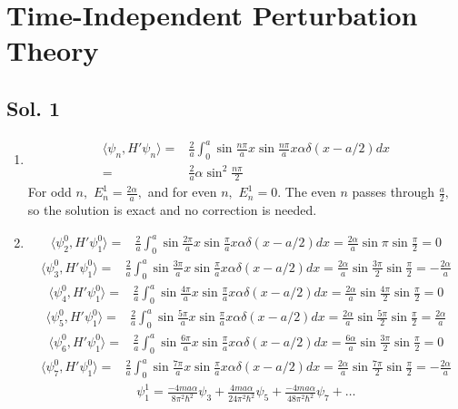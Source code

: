 \section{Time-Independent Perturbation Theory}
\subsection*{Sol. 1}
\begin{enumerate}
    \item 
    \begin{align*}
        \langle \psi_n, H'\psi_n\rangle
        =&\frac{2}{a}\int_0^a
        \sin\frac{n\pi}{a}x\sin\frac{n\pi}{a}x\alpha\delta(x-a/2)dx\\
        =&\frac{2}{a}\alpha
        \sin^2\frac{n\pi}{2}
    \end{align*}
    For odd $n,$ $E^1_n=\frac{2\alpha}{a},$ and for even $n,$ $E^1_n=0.$ The even $n$ passes through $\frac{a}{2},$ so the solution is exact and no correction is needed.
    \item 
    \begin{align*}
        \langle\psi_2^0, H'\psi^0_1\rangle=&
        \frac{2}{a}\int_0^a
        \sin\frac{2\pi}{a}x\sin\frac{\pi}{a}x\alpha\delta(x-a/2)dx=\frac{2\alpha}{a}\sin\pi\sin\frac{\pi}{2}=0
    \end{align*}
    \begin{align*}
        \langle\psi_3^0, H'\psi^0_1\rangle=&
        \frac{2}{a}\int_0^a
        \sin\frac{3\pi}{a}x\sin\frac{\pi}{a}x\alpha\delta(x-a/2)dx=\frac{2\alpha}{a}\sin\frac{3\pi}{2}\sin\frac{\pi}{2}=-\frac{2\alpha}{a}
    \end{align*}
    \begin{align*}
        \langle\psi_4^0, H'\psi^0_1\rangle=&
        \frac{2}{a}\int_0^a
        \sin\frac{4\pi}{a}x\sin\frac{\pi}{a}x\alpha\delta(x-a/2)dx=\frac{2\alpha}{a}\sin\frac{4\pi}{2}\sin\frac{\pi}{2}=0
    \end{align*}
    \begin{align*}
        \langle\psi_5^0, H'\psi^0_1\rangle=&
        \frac{2}{a}\int_0^a
        \sin\frac{5\pi}{a}x\sin\frac{\pi}{a}x\alpha\delta(x-a/2)dx=\frac{2\alpha}{a}\sin\frac{5\pi}{2}\sin\frac{\pi}{2}=\frac{2\alpha}{a}
    \end{align*}
    \begin{align*}
        \langle\psi_6^0, H'\psi^0_1\rangle=&
        \frac{2}{a}\int_0^a
        \sin\frac{6\pi}{a}x\sin\frac{\pi}{a}x\alpha\delta(x-a/2)dx=\frac{6\alpha}{a}\sin\frac{3\pi}{2}\sin\frac{\pi}{2}=0
    \end{align*}
    \begin{align*}
        \langle\psi_7^0, H'\psi^0_1\rangle=&
        \frac{2}{a}\int_0^a
        \sin\frac{7\pi}{a}x\sin\frac{\pi}{a}x\alpha\delta(x-a/2)dx=\frac{2\alpha}{a}\sin\frac{7\pi}{2}\sin\frac{\pi}{2}=-\frac{2\alpha}{a}
    \end{align*}
    \begin{align*}
        \psi^1_1=\frac{-4ma\alpha}{8\pi^2\hbar^2}\psi_3
        +\frac{4ma\alpha}{24\pi^2\hbar^2}\psi_5
        +
        \frac{-4ma\alpha}{48\pi^2\hbar^2}\psi_7+\dots
    \end{align*}


\end{enumerate}
